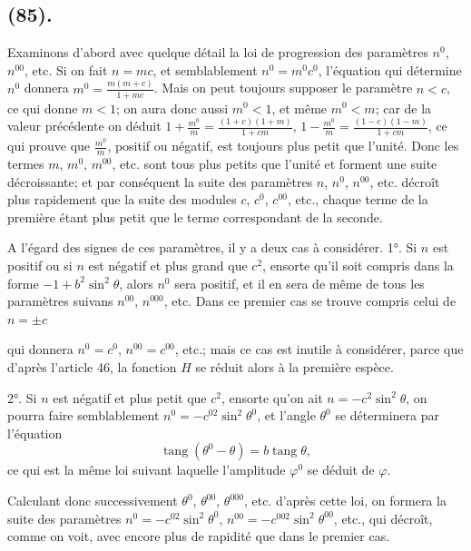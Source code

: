 \documentclass{article}
\begin{document}
\subsection*{(85).}

Examinons d'abord avec quelque détail la loi de progression des paramètres $n^{0}$, $n^{00}$, etc. Si on fait $n=mc$, et semblablement $n^{0}=m^{0}c^{0}$, l'équation qui détermine $n^{0}$ donnera $m^{0}=\frac{m(m+c)}{1+mc}$. Mais on peut toujours supposer le paramètre $n<c$, ce qui donne $m<1$; on aura donc aussi $m^{0}<1$, et même $m^{0}<m$; car de la valeur précédente on déduit $1+\frac{m^{0}}{m}=\frac{(1+c)(1+m)}{1+cm}$, $1-\frac{m^{0}}{m}=\frac{(1-c)(1-m)}{1+cm}$, ce qui prouve que $\frac{m^{0}}{m}$, positif ou négatif, est toujours plus petit que l'unité. Donc les termes $m$, $m^{0}$, $m^{00}$, etc. sont tous plus petits que l'unité et forment une suite décroissante; et par conséquent la suite des paramètres $n$, $n^{0}$, $n^{00}$, etc. décroît plus rapidement que la suite des modules $c$, $c^{0}$, $c^{00}$, etc., chaque terme de la première étant plus petit que le terme correspondant de la seconde.

A l'égard des signes de ces paramètres, il y a deux cas à considérer. 1°. Si $n$ est positif ou si $n$ est négatif et plus grand que $c^{2}$, ensorte qu'il soit compris dans la forme $-1+b^{2}\sin^{2}\theta$, alors $n^{0}$ sera positif, et il en sera de même de tous les paramètres suivans $n^{00}$, $n^{000}$, etc. Dans ce premier cas se trouve compris celui de $n=\pm c$

qui donnera $n^{0}=c^{0}$, $n^{00}=c^{00}$, etc.; mais ce cas est inutile à considérer, parce que d'après l'article 46, la fonction $H$ se réduit alors à la première espèce.

2°. Si $n$ est négatif et plus petit que $c^{2}$, ensorte qu'on ait $n=-c^{2}\sin^{2}\theta$, on pourra faire semblablement $n^{0}=-c^{02}\sin^{2}\theta^{0}$, et l'angle $\theta^{0}$ se déterminera par l'équation
\[ \operatorname{tang}(\theta^{0}-\theta)=b\operatorname{tang}\theta, \]
ce qui est la même loi suivant laquelle l'amplitude $\varphi^{0}$ se déduit de $\varphi$.

Calculant donc successivement $\theta^{0}$, $\theta^{00}$, $\theta^{000}$, etc. d'après cette loi, on formera la suite des paramètres $n^{0}=-c^{02}\sin^{2}\theta^{0}$, $n^{00}=-c^{002}\sin^{2}\theta^{00}$, etc., qui décroît, comme on voit, avec encore plus de rapidité que dans le premier cas.
\end{document}
